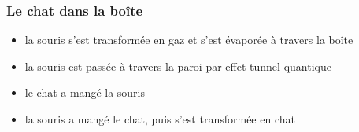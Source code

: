 \documentclass{beamer}
\begin{document}
\begin{frame}[plain]
    \frametitle{Le chat dans la boîte}


    \begin{itemize}
            \item<2-> la souris s'est transformée en gaz et s'est évaporée à travers la boîte
            \item<3-> la souris est passée à travers la paroi par effet tunnel quantique
            \item<4-> le chat a mangé la souris
            \item<5-> la souris a mangé le chat, puis s'est transformée en chat
    \end{itemize}

    \vspace{.5cm} 
    

\end{frame}
\end{document}
